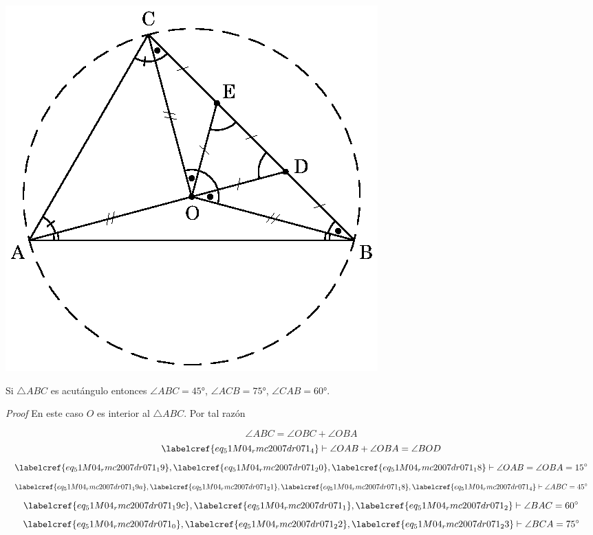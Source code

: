 \includegraphics{share/euk/51M04_rmc2007dr071_1.eps}

\begin{claim}
	Si $\triangle{ABC}$ es acutángulo entonces $\angle{ABC} = \ang{45}$, $\angle{ACB} = \ang{75}$, $\angle{CAB} = \ang{60}$.
\end{claim}
\textit{Proof}
En este caso $O$ es interior al $\triangle{ABC}$. Por tal razón

\begin{equation} \label{eq_51M04_rmc2007dr071_19a}
	\angle{ABC} = \angle{OBC} + \angle{OBA}
\end{equation}
\begin{equation} \label{eq_51M04_rmc2007dr071_20}
	\labelcref{eq_51M04_rmc2007dr071_4} \vdash \angle{OAB} + \angle{OBA} = \angle{BOD}
\end{equation}
\begin{equation} \label{eq_51M04_rmc2007dr071_21}
	\labelcref{eq_51M04_rmc2007dr071_19}, \labelcref{eq_51M04_rmc2007dr071_20}, \labelcref{eq_51M04_rmc2007dr071_18} \vdash \angle{OAB} = \angle{OBA} = \ang{15}
\end{equation}
\begin{equation} \label{eq_51M04_rmc2007dr071_22}
	\labelcref{eq_51M04_rmc2007dr071_19a}, \labelcref{eq_51M04_rmc2007dr071_21}, \labelcref{eq_51M04_rmc2007dr071_18}, \labelcref{eq_51M04_rmc2007dr071_4} \vdash \angle{ABC} = \ang{45}
\end{equation}
\begin{equation} \label{eq_51M04_rmc2007dr071_23}
	\labelcref{eq_51M04_rmc2007dr071_19c}, \labelcref{eq_51M04_rmc2007dr071_1}, \labelcref{eq_51M04_rmc2007dr071_2} \vdash \angle{BAC} = \ang{60}
\end{equation}
\begin{equation} \label{eq_51M04_rmc2007dr071_24}
	\labelcref{eq_51M04_rmc2007dr071_0}, \labelcref{eq_51M04_rmc2007dr071_22}, \labelcref{eq_51M04_rmc2007dr071_23} \vdash \angle{BCA} = \ang{75}
\end{equation}

